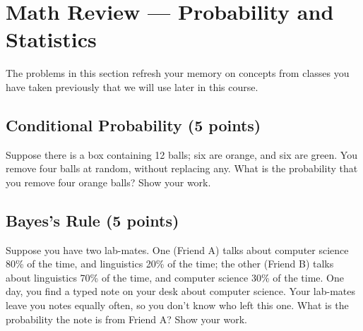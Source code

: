 \documentclass[12pt,a4paper]{article}
\begin{document}
\section{Math Review --- Probability and Statistics}

The problems in this section refresh your memory on concepts from classes you have taken previously that we will use later in this course.

\subsection{Conditional Probability (5 points)}

Suppose there is a box containing 12 balls; six are orange, and six are green. You remove four balls at random, without replacing any. What is the probability that you remove four orange balls? Show your work.

{
}

\subsection{Bayes's Rule (5 points)}

Suppose you have two lab-mates. One (Friend A) talks about computer science 80\% of the time, and linguistics 20\% of the time; the other (Friend B) talks about linguistics 70\% of the time, and computer science 30\% of the time. One day, you find a typed note on your desk about computer science. Your lab-mates leave you notes equally often, so you don't know who left this one. What is the probability the note is from Friend A? Show your work.
\end{document}
